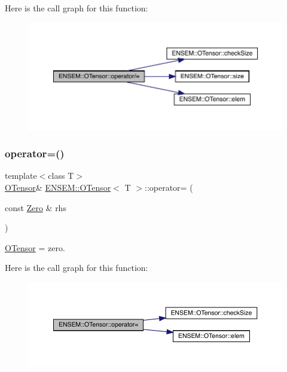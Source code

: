 Here is the call graph for this function\+:
\nopagebreak
\begin{figure}[H]
\begin{center}
\leavevmode
\includegraphics[width=350pt]{da/d8a/classENSEM_1_1OTensor_af8fb32358b6c05989221297a9b33096c_cgraph}
\end{center}
\end{figure}
\mbox{\label{classENSEM_1_1OTensor_aae562552ce915d3d39c65dfe463fa50a}} 
\subsubsection{\texorpdfstring{operator=()}{operator=()}\hspace{0.1cm}{\footnotesize\ttfamily [1/8]}}
{\footnotesize\ttfamily template$<$class T$>$ \\
\mbox{\hyperlink{classENSEM_1_1OTensor}{O\+Tensor}}\& \mbox{\hyperlink{classENSEM_1_1OTensor}{E\+N\+S\+E\+M\+::\+O\+Tensor}}$<$ T $>$\+::operator= (\begin{DoxyParamCaption}\item[{const \mbox{\hyperlink{structENSEM_1_1Zero}{Zero}} \&}]{rhs }\end{DoxyParamCaption})\hspace{0.3cm}{\ttfamily [inline]}}



\mbox{\hyperlink{classENSEM_1_1OTensor}{O\+Tensor}} = zero. 

Here is the call graph for this function\+:
\nopagebreak
\begin{figure}[H]
\begin{center}
\leavevmode
\includegraphics[width=350pt]{da/d8a/classENSEM_1_1OTensor_aae562552ce915d3d39c65dfe463fa50a_cgraph}
\end{center}
\end{figure}
\mbox{\label{classENSEM_1_1OTensor_aae562552ce915d3d39c65dfe463fa50a}} 
